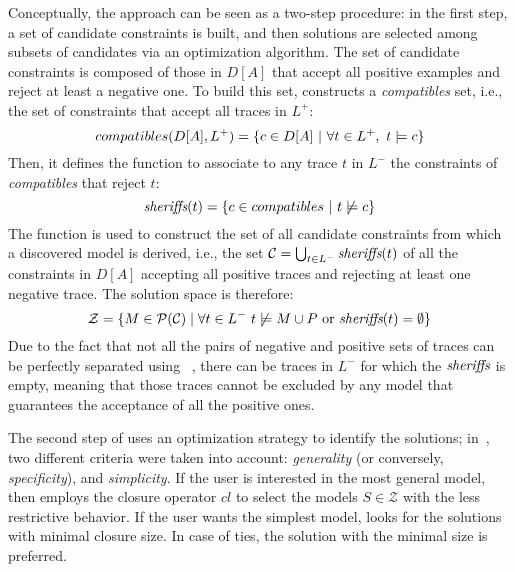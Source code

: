 Conceptually, the \nd approach can be seen as a two-step procedure: in the first step, a set of candidate constraints is built, and then solutions are selected among subsets of candidates via an optimization algorithm.
%
The set of candidate constraints is composed of %
those in $D[A]$ that accept all positive examples and reject at least a negative one. To build this set, \nd constructs a \emph{compatibles} set, i.e., the set of constraints that accept all traces in $L^+$: 
\begin{equation}
{compatibles(D[A], L^+)} = \{c\in D[A]~|~\forall t\in L^+,~ t\models c \} \\
\end{equation}
%
Then, it defines the \textit{\sheriff} function to associate to any trace $t$ in $L^-$ the constraints of \textit{compatibles} that reject %
$t$:
\begin{equation}
{\textit{sheriffs}}(t) = \{c\in {compatibles}~|~t\not\models c\} \\
\end{equation}
%
The \textit{\sheriff} function is used to construct the set of all candidate constraints from which a discovered model is derived, i.e., the set $\mathcal{C} = \bigcup_{t\in L^-} \textit{sheriffs}(t)$ of all the constraints in $D[A]$ accepting all positive traces and rejecting at least one negative trace. The solution space is therefore:
\begin{equation}
  \mathcal{Z}=\{M\in\mathcal{P}(\mathcal{C})\mid \forall t\in L^-~t\not\models M\cup P \text{ or } {\textit{sheriffs}}(t) = \emptyset \}
\end{equation}
Due to the fact that not all the pairs of negative and positive sets of traces can be perfectly separated using \declare~\cite{DBLP:conf/bpm/SlaatsDB21}, there can be traces in $L^-$ for which the ${\textit{sheriffs}}$ is empty, meaning that those traces cannot be excluded by any model that guarantees the acceptance of all the positive ones.

The second step of \nd uses an optimization strategy to identify the solutions; in~\cite{deviant-tkde}, two different criteria were taken into account: \emph{generality} (or conversely, \emph{specificity}), and \emph{simplicity}.
If the user is interested in the most general model, then \nd employs the closure operator $cl$ to select the models $S \in \mathcal{Z}$ with the less restrictive behavior.
If the user wants the simplest model, \nd looks for the solutions with minimal closure size. In case of ties, the solution with the minimal size is preferred.



